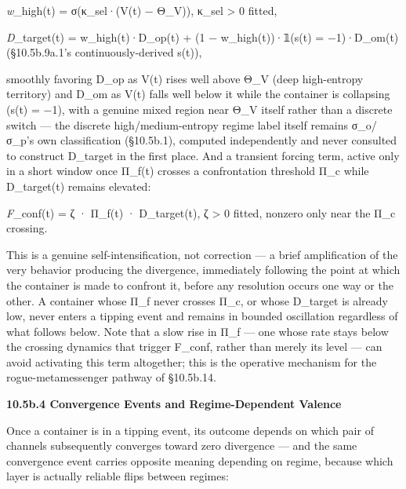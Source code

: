 \documentclass[
]{article}
\begin{document}
\emph{w}\_high(t) = σ(κ\_sel·(V(t) − Θ\_V)), κ\_sel \textgreater{} 0
fitted,

\emph{D}\_target(t) = w\_high(t)·D\_op(t) + (1 − w\_high(t))·𝟙(s(t) =
−1)·D\_om(t) (§10.5b.9a.1's continuously-derived s(t)),

smoothly favoring D\_op as V(t) rises well above Θ\_V (deep high-entropy
territory) and D\_om as V(t) falls well below it while the container is
collapsing (s(t) = −1), with a genuine mixed region near Θ\_V itself
rather than a discrete switch --- the discrete high/medium-entropy
regime label itself remains σ\_o/σ\_p's own classification (§10.5b.1),
computed independently and never consulted to construct D\_target in the
first place. And a transient forcing term, active only in a short window
once Π\_f(t) crosses a confrontation threshold Π\_c while D\_target(t)
remains elevated:

\emph{F}\_conf(t) = ζ · Π\_f(t) · D\_target(t), ζ \textgreater{} 0
fitted, nonzero only near the Π\_c crossing.

This is a genuine self-intensification, not correction --- a brief
amplification of the very behavior producing the divergence, immediately
following the point at which the container is made to confront it,
before any resolution occurs one way or the other. A container whose
Π\_f never crosses Π\_c, or whose D\_target is already low, never enters
a tipping event and remains in bounded oscillation regardless of what
follows below. Note that a slow rise in Π\_f --- one whose rate stays
below the crossing dynamics that trigger F\_conf, rather than merely its
level --- can avoid activating this term altogether; this is the
operative mechanism for the rogue-metamessenger pathway of §10.5b.14.

\textbf{10.5b.4 Convergence Events and Regime-Dependent Valence}

Once a container is in a tipping event, its outcome depends on which
pair of channels subsequently converges toward zero divergence --- and
the same convergence event carries opposite meaning depending on regime,
because which layer is actually reliable flips between regimes:
\end{document}
